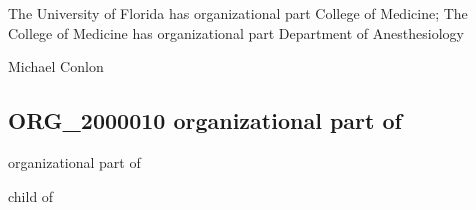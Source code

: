 \documentclass[letterpaper,10pt,english]{sphinxmanual}
\begin{document}
\begin{sphinxShadowBox}

\sphinxAtStartPar
{\hyperref[\detokenize{doc-ORG_2000010::doc}]{}}
\end{sphinxShadowBox}

\begin{sphinxShadowBox}

\sphinxAtStartPar
The University of Florida has organizational part College of Medicine; The College of Medicine has organizational part Department of Anesthesiology
\end{sphinxShadowBox}

\begin{sphinxShadowBox}

\sphinxAtStartPar
Michael Conlon 
\end{sphinxShadowBox}
\begin{quote}

\ignorespaces \end{quote}


\subsection{ORG\_2000010 \sphinxhyphen{} organizational part of}
\label{\detokenize{doc-ORG_2000010:org-2000010-organizational-part-of}}\label{\detokenize{doc-ORG_2000010:index-0}}\label{\detokenize{doc-ORG_2000010::doc}}
\begin{sphinxShadowBox}

\sphinxAtStartPar
organizational part of
\end{sphinxShadowBox}

\begin{sphinxShadowBox}

\sphinxAtStartPar
child of
\end{sphinxShadowBox}

\begin{sphinxShadowBox}

\sphinxAtStartPar
{}
\end{sphinxShadowBox}
\end{document}

